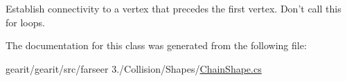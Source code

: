 Establish connectivity to a vertex that precedes the first vertex. Don't call this for loops. 



The documentation for this class was generated from the following file\+:\begin{DoxyCompactItemize}
\item 
gearit/gearit/src/farseer 3./\+Collision/\+Shapes/\hyperlink{_chain_shape_8cs}{Chain\+Shape.\+cs}\end{DoxyCompactItemize}
